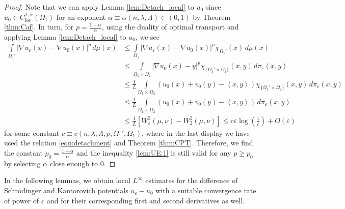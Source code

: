 \documentclass[reqno,12pt]{article}
\DeclareMathOperator{\loc}{loc}
\newcommand{\inner}[2]{\left\langle #1, #2 \right\rangle}
\newcommand{\I}{\int\limits}
\begin{document}
\begin{proof}
   Note that we can apply Lemma \ref{lem:Detach_local} to $u_{0}$ since $u_{0}\in C^{1,\alpha}_{\loc}(\Omega_{1})$ for an exponent $\alpha\equiv \alpha(n,\lambda,\Lambda)\in (0,1)$ by Theorem \ref{thm:Caf}. In turn, for $p =  \frac{1+\alpha}{\alpha}$, using the duality of optimal transport and applying Lemma \ref{lem:Detach_local} to $u_{0}$, we see 
\begin{align*}
    \I_{\Omega_{1}'} |\nabla u_{\varepsilon}(x)-\nabla u_{0}(x)|^{p}\,d\mu(x)
    &\leqslant
    \I_{\Omega_{1}} |\nabla u_{\varepsilon}(x)-\nabla u_{0}(x)|^{p}\chi_{\Omega_{1}'}(x)\,d\mu(x)
    \\&
    \leqslant
    \I_{\Omega_{1}\times \Omega_{2}} |\nabla u_{0}(x)-y|^{p}\chi_{\{ \Omega_{1}'\times\Omega_{2}\}}(x,y)\,d\pi_{\varepsilon}(x,y)
    \\&
    \leqslant
    \frac 1L \I_{\Omega_{1}\times \Omega_{2}} \left( u_{0}(x) + v_{0}(y)-\inner{x}{y} \right)\chi_{\{ \Omega_{1}'\times\Omega_{2}\}}(x,y)\,d\pi_{\varepsilon}(x,y)
    \\&
    \leqslant
    \frac 1L \I_{\Omega_{1}\times \Omega_{2}} \left( u_{0}(x) + v_{0}(y)-\inner{x}{y} \right)\,d\pi_{\varepsilon}(x,y)
    \\&
    \leqslant
    \frac 1L\left[ W_{\varepsilon}^{2}(\mu,\nu)-W_{2}^{2}(\mu,\nu)\right]
    \leqslant
    c\varepsilon\log\left(\frac{1}{\varepsilon}\right) + O(\varepsilon)
\end{align*}
for some constant $c\equiv c(n,\lambda,\Lambda,p,\Omega_{1}',\Omega_{1})$, where in the last display we have used the relation \eqref{eqn:detachment} and Theorem \ref{thm:CPT}. Therefore, we find the constant $p_{0} = \frac{1+\alpha}{\alpha}$ and the inequality \eqref{lem:UE:1} is still valid for any $p\geqslant p_0$ by selecting $\alpha$ close enough to $0$.
\end{proof}

In the following lemmas, we obtain local $L^{\infty}$ estimates for the difference of Schr\"odinger and Kantorovich potentials $u_{\varepsilon} - u_0$ with a suitable convergence rate of power of $\varepsilon$ and for their corresponding first and second derivatives as well.
\end{document}
